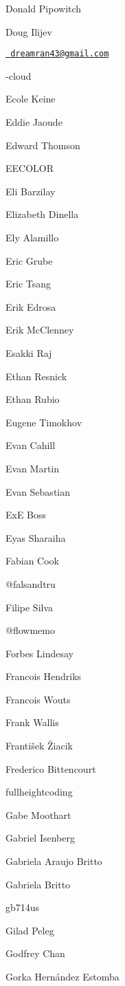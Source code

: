 \begin{DoxyItemize}
\item Donald Pipowitch
\item Doug Ilijev
\item \href{mailto:dreamran43@gmail.com}{\texttt{ dreamran43@gmail.\+com}}
\item {\itshape }-\/cloud
\item Ecole Keine
\item Eddie Jaoude
\item Edward Thomson
\item E\+E\+C\+O\+L\+OR
\item Eli Barzilay
\item Elizabeth Dinella
\item Ely Alamillo
\item Eric Grube
\item Eric Tsang
\item Erik Edrosa
\item Erik Mc\+Clenney
\item Esakki Raj
\item Ethan Resnick
\item Ethan Rubio
\item Eugene Timokhov
\item Evan Cahill
\item Evan Martin
\item Evan Sebastian
\item ExE Boss
\item Eyas Sharaiha
\item Fabian Cook
\item @falsandtru
\item Filipe Silva
\item @flowmemo
\item Forbes Lindesay
\item Francois Hendriks
\item Francois Wouts
\item Frank Wallis
\item František Žiacik
\item Frederico Bittencourt
\item fullheightcoding
\item Gabe Moothart
\item Gabriel Isenberg
\item Gabriela Araujo Britto
\item Gabriela Britto
\item gb714us
\item Gilad Peleg
\item Godfrey Chan
\item Gorka Hernández Estomba

\end{DoxyItemize}
